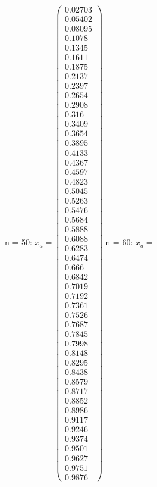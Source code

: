 \documentclass{udpreport}
\begin{document}
\begin{enumerate}
\begin {enumerate}
\begin{enumerate}
\begin{itemize}
\begin{itemize}
				n = 50: $x_{a} = \left(\begin{array}{c} 0.02703\\ 0.05402\\ 0.08095\\ 0.1078\\ 0.1345\\ 0.1611\\ 0.1875\\ 0.2137\\ 0.2397\\ 0.2654\\ 0.2908\\ 0.316\\ 0.3409\\ 0.3654\\ 0.3895\\ 0.4133\\ 0.4367\\ 0.4597\\ 0.4823\\ 0.5045\\ 0.5263\\ 0.5476\\ 0.5684\\ 0.5888\\ 0.6088\\ 0.6283\\ 0.6474\\ 0.666\\ 0.6842\\ 0.7019\\ 0.7192\\ 0.7361\\ 0.7526\\ 0.7687\\ 0.7845\\ 0.7998\\ 0.8148\\ 0.8295\\ 0.8438\\ 0.8579\\ 0.8717\\ 0.8852\\ 0.8986\\ 0.9117\\ 0.9246\\ 0.9374\\ 0.9501\\ 0.9627\\ 0.9751\\ 0.9876 \end{array}\right)$	
				n = 60: $x_{a} = $	
				

\end{itemize}
\end{itemize}
\end{enumerate}
\end{enumerate}
\end{enumerate}
\end{document}
